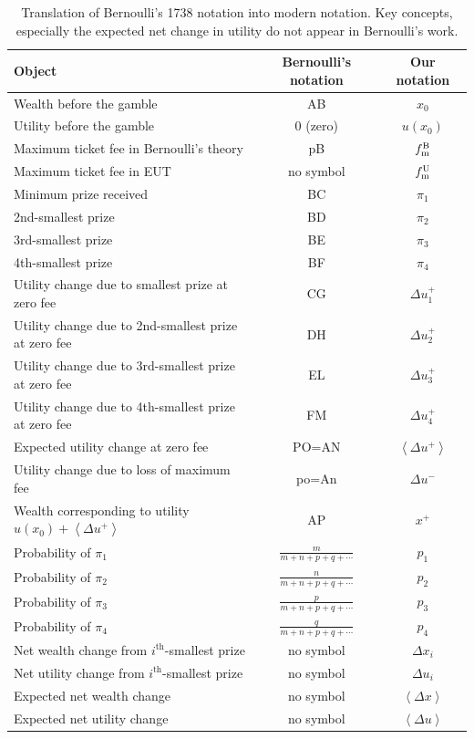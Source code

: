 \documentclass[final]{ectaart}
\newcommand{\ave}[1]{\left\langle#1 \right\rangle}
\newcommand{\tlabel}[1]{\label{tab:#1}}
\newcommand{\Dx}{{\Delta x}}
\newcommand{\Du}{\Delta u}
\newcommand{\tml}{{f_{\text{\normalfont{m}}}^{\text{\normalfont{U}}}}}
\newcommand{\tmb}{{f_{\text{\normalfont{m}}}^{\text{\normalfont{B}}}}}
\theoremstyle{plain}
\begin{document}
\begin{center}
\begin{table}
  \begin{tabular}{ l | c | c }
    \hline
    Object & Bernoulli's notation & Our notation \\ \hline    
    Wealth before the gamble & AB & $x_0$ \\
    Utility before the gamble & $0$ (zero) & $u(x_0)$\\
    Maximum ticket fee in Bernoulli's theory & pB & $\tmb$ \\
    Maximum ticket fee in EUT & no symbol & $\tml$ \\
    Minimum prize received & BC & $\pi_1$\\
    2nd-smallest prize & BD & $\pi_2$\\
    3rd-smallest prize & BE & $\pi_3$\\
    4th-smallest prize & BF & $\pi_4$\\
Utility change due to smallest prize at zero fee & CG&$\Du^+_1$\\
Utility change due to 2nd-smallest prize at zero fee & DH&$\Du^+_2$\\
Utility change due to 3rd-smallest prize at zero fee & EL&$\Du^+_3$\\
Utility change due to 4th-smallest prize at zero fee & FM&$\Du^+_4$\\
Expected utility change at zero fee & PO=AN&$\ave{\Du^+}$\\
    Utility change due to loss of maximum fee & po=An &$\Du^{-}$\\
    Wealth corresponding to utility $u(x_0)+\ave{\Delta u^+}$ &AP&$x^+$\\
Probability of $\pi_1$ &$\frac{m}{m+n+p+q+\cdots}$&$p_1$\\
Probability of $\pi_2$ &$\frac{n}{m+n+p+q+\cdots}$&$p_2$\\
Probability of $\pi_3$ &$\frac{p}{m+n+p+q+\cdots}$&$p_3$\\
Probability of $\pi_4$ &$\frac{q}{m+n+p+q+\cdots}$&$p_4$\\
Net wealth change from $i^{\text{th}}$-smallest prize & no symbol & $\Dx_i$\\
Net utility change from $i^{\text{th}}$-smallest prize & no symbol & $\Du_i$\\
Expected net wealth change & no symbol & $\ave{\Dx}$\\
Expected net utility change & no symbol & $\ave{\Du}$\\
    \hline
  \end{tabular}
\caption{Translation of Bernoulli's 1738 notation into modern notation. Key concepts, especially the expected net change in utility do not appear in Bernoulli's work.}
    \tlabel{key}
\end{table}
\end{center}
\end{document}
